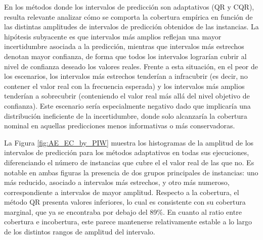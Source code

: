 En los métodos donde los intervalos de predicción son adaptativos (QR y CQR), resulta relevante analizar cómo se comporta la cobertura empírica en función de las distintas amplitudes de intervalos de predicción obtenidos de las instancias. La hipótesis subyacente es que intervalos más amplios reflejan una mayor incertidumbre asociada a la predicción, mientras que intervalos más estrechos denotan mayor confianza, de forma que todos los intervalos lograrían cubrir al nivel de confianza deseado los valores reales. 
Frente a esta situación, en el peor de los escenarios, los intervalos más estrechos tenderían a infracubrir (es decir, no contener el valor real con la frecuencia esperada) y los intervalos más amplios tenderían a sobrecubrir (conteniendo el valor real más allá del nivel objetivo de confianza). Este escenario sería especialmente negativo dado que implicaría una distribución ineficiente de la incertidumbre, donde solo alcanzaría la cobertura nominal en aquellas predicciones menos informativas o más conservadoras.

La Figura \ref{fig:AE_EC_by_PIW} muestra los histogramas de la amplitud de los intervalos de predicción para los métodos adaptativos en todas sus ejecuciones, diferenciando el número de instancias que cubre el el valor real de las que no. Es notable en ambas figuras la presencia de dos grupos principales de instancias: uno más reducido, asociado a intervalos más estrechos, y otro más numeroso, correspondiente a intervalos de mayor amplitud. Respecto a la cobertura, el método QR presenta valores inferiores, lo cual es consistente con su cobertura marginal, que ya se encontraba por debajo del 89\%. En cuanto al ratio entre cobertura e incobertura, este parece mantenerse relativamente estable a lo largo de los distintos rangos de amplitud del intervalo. 

